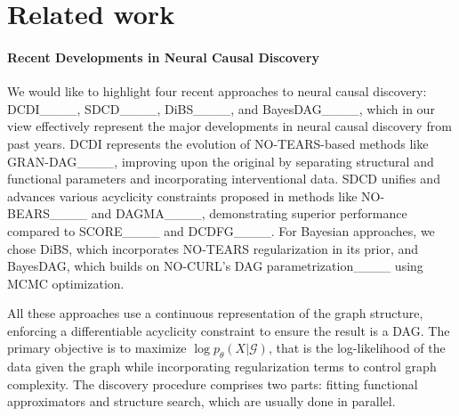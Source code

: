 \section{Related work}
\label{sec:related_work}


\paragraph{Recent Developments in Neural Causal Discovery}
\label{par:score_based}



We would like to highlight four recent approaches to neural causal discovery: DCDI____, SDCD____, DiBS____, and BayesDAG____, which in our view effectively represent the major developments in neural causal discovery from  past years. DCDI represents the evolution of NO-TEARS-based methods like GRAN-DAG____, improving upon the original by separating structural and functional parameters and incorporating interventional data. SDCD unifies and advances various acyclicity constraints proposed in methods like NO-BEARS____ and DAGMA____, demonstrating superior performance compared to SCORE____ and DCDFG____. For Bayesian approaches, we chose DiBS, which incorporates NO-TEARS regularization in its prior, and BayesDAG, which builds on NO-CURL's DAG parametrization____ using MCMC optimization. 

All these approaches use a continuous representation of the graph structure, enforcing a differentiable acyclicity constraint to ensure the result is a DAG. The primary objective is to maximize $\log p_\theta(X|\mathcal{G})$, that is the log-likelihood of the data given the graph while incorporating regularization terms to control graph complexity.
The discovery procedure comprises two parts: fitting functional approximators and structure search, which are usually done in parallel.


